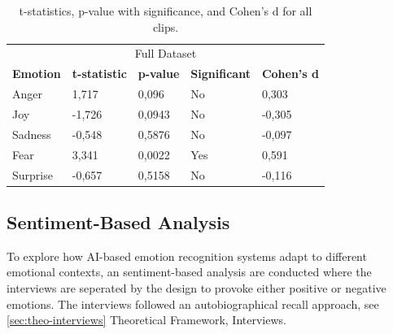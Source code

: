 \begin{table}[!h]
    \centering
    \begin{tabular}{lllll}
    \multicolumn{5}{c}{\cellcolor[HTML]{C0C0C0}Full Dataset}                                                                                                                                                    \\
    \multicolumn{1}{c|}{\textbf{Emotion}} & \multicolumn{1}{c}{\textbf{t-statistic}} & \multicolumn{1}{c}{\textbf{p-value}} & \multicolumn{1}{c}{\textbf{Significant}} & \multicolumn{1}{c}{\textbf{Cohen's d}} \\ \hline
    \multicolumn{1}{l|}{Anger}            & 1,717                                    & 0,096                                & No                                       & 0,303                                  \\
    \multicolumn{1}{l|}{Joy}              & -1,726                                   & 0,0943                               & No                                       & -0,305                                 \\
    \multicolumn{1}{l|}{Sadness}          & -0,548                                   & 0,5876                               & No                                       & -0,097                                 \\
    \multicolumn{1}{l|}{Fear}             & 3,341                                    & 0,0022                               & Yes                                      & 0,591                                  \\
    \multicolumn{1}{l|}{Surprise}         & -0,657                                   & 0,5158                               & No                                       & -0,116                                
    \end{tabular}
    \caption{t-statistics, p-value with significance, and Cohen's d for all clips.}
    \label{tab:t-test-all}
\end{table}


\subsection{Sentiment-Based Analysis}
To explore how AI-based emotion recognition systems adapt to different emotional contexts, an sentiment-based analysis are conducted where the interviews are seperated by the design to provoke either positive or negative emotions.
The interviews followed an autobiographical recall approach, see \ref{sec:theo-interviews} Theoretical Framework, Interviews. 

